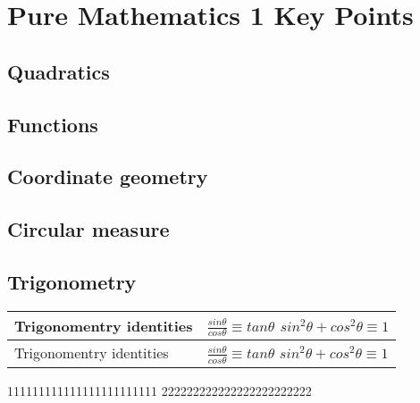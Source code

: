 \chapter{Pure Mathematics 1 Key Points}
\section{Quadratics}


\section{Functions}


\section{Coordinate geometry}


\section{Circular measure}


\section{Trigonometry}

\begin{tabular}{ |  l | p{8cm} |}
    \hline
    Trigonomentry identities &  
                                $ \displaystyle \frac {sin\theta} {cos\theta} \equiv tan\theta $ 
                                \newline
                                 \newline
                                $ sin^2\theta + cos^2\theta \equiv 1 $ 
                                \newline 
                                \\
    \hline 
    
    Trigonomentry identities & $ \displaystyle \frac {sin\theta} {cos\theta} \equiv tan\theta $ \newline $ sin^2\theta + cos^2\theta \equiv 1 $ \\
    
    \hline
\end{tabular}



\begin{exercise}

111111111111111111111111
222222222222222222222222
\end{exercise}

